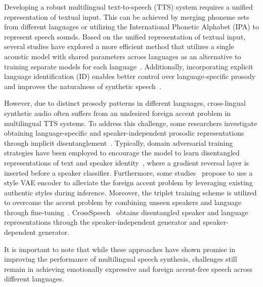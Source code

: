 \documentclass[journal,comsoc]{IEEEtran}
\begin{document}
Developing a robust multilingual text-to-speech (TTS) system requires a unified representation of textual input. This can be achieved by merging phoneme sets from different languages or utilizing the International Phonetic Alphabet (IPA) to represent speech sounds. Based on the unified representation of textual input, several studies have explored a more efficient method that utilizes a single acoustic model with shared parameters across languages as an alternative to training separate models for each language~\cite{DBLP:conf/ssw/SitaramRRB16,DBLP:conf/interspeech/XueSXXW19,DBLP:conf/icassp/NachmaniW19}. Additionally, incorporating explicit language identification (ID) enables better control over language-specific prosody and improves the naturalness of synthetic speech~\cite{DBLP:conf/interspeech/LiZ16, DBLP:conf/interspeech/PengL22}.

However, due to distinct prosody patterns in different languages, %
cross-lingual synthetic audio often suffers from an undesired foreign accent problem in multilingual TTS systems. To address this challenge, some researchers investigate obtaining language-specific and speaker-independent prosodic representations through implicit disentanglement~\cite{DBLP:conf/interspeech/XinSTKS20,DBLP:conf/icassp/XinKTS21}. Typically, domain adversarial training strategies have been employed to encourage the model to learn disentangled representations of text and speaker identity~\cite{DBLP:conf/interspeech/ZhangWZWCSJRR19,DBLP:conf/interspeech/NekvindaD20,DBLP:conf/interspeech/PengL22}, where a gradient reversal layer is inserted before a speaker classifier. Furthermore, some studies~\cite{DBLP:conf/interspeech/ShangHZZ021,DBLP:conf/interspeech/RattcliffeWMKMC22} propose to use a style VAE encoder to alleviate the foreign accent problem by leveraging existing authentic styles during inference. Moreover, the triplet training scheme is utilized to overcome the accent problem by combining unseen speakers and language through fine-tuning~\cite{DBLP:conf/icassp/YeZSHRLL22}. CrossSpeech~\cite{DBLP:journals/corr/abs-2302-14370} obtains disentangled speaker and language representations through the speaker-independent generator and speaker-dependent generator.


It is important to note that while these approaches have shown promise in improving the performance of multilingual speech synthesis, challenges still remain in achieving emotionally expressive and foreign accent-free speech across different languages. %
\end{document}
